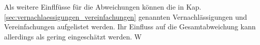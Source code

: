 Als weitere Einflfüsse für die Abweichungen können die in Kap. \ref{sec:vernachlaessigungen_vereinfachungen} genannten Vernachlässigungen und Vereinfachungen aufgelistet werden. Ihr Einfluss auf die Gesamtabweichung kann allerdings als gering eingeschätzt werden.
W%





